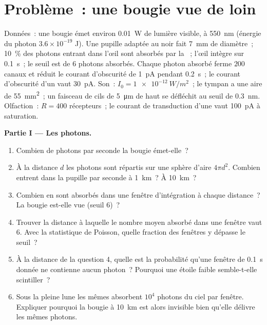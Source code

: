 \section{Problème~: une bougie vue de loin}

\begin{problem}
\label{pb:b3:sensory-systems:1}
Données~: une bougie émet environ \qty{0.01}{W} de lumière visible, à
\qty{550}{nm} (énergie du photon $3.6\times 10^{-19}$ J). Une pupille
adaptée au noir fait \qty{7}{mm} de diamètre~; \qty{10}{\%} des photons
entrant dans l'œil sont absorbés par la ~; l'œil intègre sur
\qty{0.1}{s}~; le seuil est de $6$ photons absorbés. Chaque photon
absorbé ferme $200$ canaux et réduit le courant d'obscurité de
\qty{1}{pA} pendant \qty{0.2}{s}~; le courant d'obscurité d'un 
vaut \qty{30}{pA}. Son~: $I_{0} =
\qty{1e-12}{W/m^2}$~; le tympan a une aire de \qty{55}{mm^2}~; un
faisceau de cils de \qty{5}{\micro m} de haut se défléchit au seuil de
\qty{0.3}{nm}. Olfaction~: $R = 400$ récepteurs~; le courant de
transduction d'une  vaut \qty{100}{pA} à saturation.

\medskip
\noindent\textbf{Partie I --- Les photons.}
\begin{enumerate}
  \item Combien de photons par seconde la bougie émet-elle~?
  \item À la distance $d$ les photons sont répartis sur une sphère
        d'aire $4\pi d^{2}$. Combien entrent dans la pupille par seconde
        à \qty{1}{km}~? À \qty{10}{km}~?
  \item Combien en sont absorbés dans une fenêtre d'intégration à chaque
        distance~? La bougie est-elle vue (seuil $6$)~?
  \item Trouver la distance à laquelle le nombre moyen absorbé dans une
        fenêtre vaut $6$. Avec la statistique de Poisson, quelle
        fraction des fenêtres y dépasse le seuil~?
  \item À la distance de la question 4, quelle est la probabilité qu'une
        fenêtre de \qty{0.1}{s} donnée ne contienne aucun photon~?
        Pourquoi une étoile faible semble-t-elle scintiller~?
  \item Sous la pleine lune les mêmes  absorbent $10^{4}$
        photons du ciel par fenêtre. Expliquer pourquoi la bougie à
        \qty{10}{km} est alors invisible bien qu'elle délivre les mêmes
        photons.
\end{enumerate}


\end{problem}
